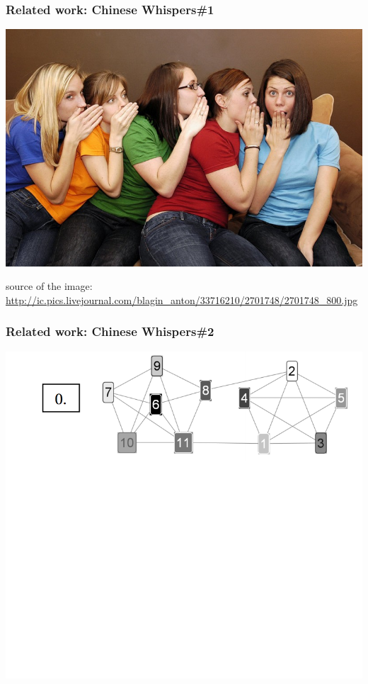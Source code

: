 \documentclass[usenames,dvipsnames]{beamer}
\begin{document}
\begin{frame}[fragile]
\frametitle{Related work: Chinese Whispers\#1}
\begin{center}
 \includegraphics[height=0.5\textwidth]{cw}
 
  {\tiny * source of the image: \url{http://ic.pics.livejournal.com/blagin_anton/33716210/2701748/2701748_800.jpg}}
 \end{center}
\end{frame}



\begin{frame}[fragile]
\frametitle{Related work: Chinese Whispers\#2}
\begin{center}
 \includegraphics[height=0.59\textwidth]{cw2-1}
 
 \end{center}
\end{frame}
\end{document}
